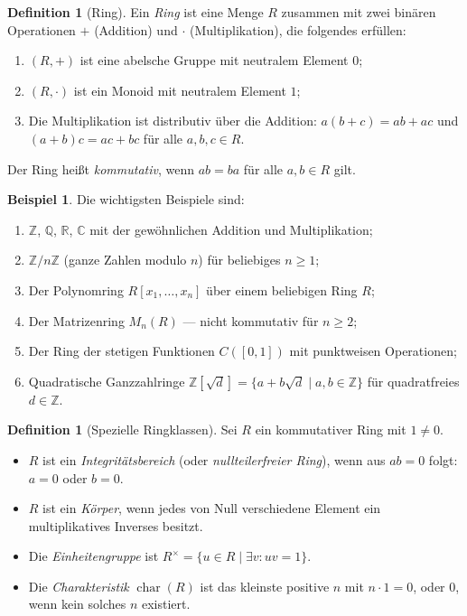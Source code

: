 \documentclass[12pt,a4paper]{amsart}
\theoremstyle{definition}
\newtheorem{definition}[theorem]{Definition}
\newtheorem{example}[theorem]{Beispiel}
\theoremstyle{definition}
\DeclareMathOperator{\chr}{char}
\begin{document}
\begin{definition}[Ring]
Ein \emph{Ring} ist eine Menge $R$ zusammen mit zwei binären Operationen $+$
(Addition) und $\cdot$ (Multiplikation), die folgendes erfüllen:
\begin{enumerate}[label=(\roman*)]
  \item $(R,+)$ ist eine abelsche Gruppe mit neutralem Element $0$;
  \item $(R,\cdot)$ ist ein Monoid mit neutralem Element $1$;
  \item Die Multiplikation ist distributiv über die Addition:
        $a(b+c) = ab + ac$ und $(a+b)c = ac + bc$ für alle $a,b,c \in R$.
\end{enumerate}
Der Ring heißt \emph{kommutativ}, wenn $ab = ba$ für alle $a,b \in R$ gilt.
\end{definition}

\begin{example}\label{bsp:ringe}
Die wichtigsten Beispiele sind:
\begin{enumerate}[label=(\alph*)]
  \item $\mathbb{Z}$, $\mathbb{Q}$, $\mathbb{R}$, $\mathbb{C}$ mit der gewöhnlichen
        Addition und Multiplikation;
  \item $\mathbb{Z}/n\mathbb{Z}$ (ganze Zahlen modulo $n$) für beliebiges $n \geq 1$;
  \item Der Polynomring $R[x_1,\ldots,x_n]$ über einem beliebigen Ring $R$;
  \item Der Matrizenring $M_n(R)$ --- nicht kommutativ für $n \geq 2$;
  \item Der Ring der stetigen Funktionen $C([0,1])$ mit punktweisen Operationen;
  \item Quadratische Ganzzahlringe $\mathbb{Z}[\sqrt{d}] = \{a + b\sqrt{d} \mid a,b \in \mathbb{Z}\}$
        für quadratfreies $d \in \mathbb{Z}$.
\end{enumerate}
\end{example}

\begin{definition}[Spezielle Ringklassen]
Sei $R$ ein kommutativer Ring mit $1 \neq 0$.
\begin{itemize}
  \item $R$ ist ein \emph{Integritätsbereich} (oder \emph{nullteilerfreier Ring}),
        wenn aus $ab = 0$ folgt: $a = 0$ oder $b = 0$.
  \item $R$ ist ein \emph{Körper}, wenn jedes von Null verschiedene Element ein
        multiplikatives Inverses besitzt.
  \item Die \emph{Einheitengruppe} ist $R^\times = \{u \in R \mid \exists v: uv = 1\}$.
  \item Die \emph{Charakteristik} $\chr(R)$ ist das kleinste positive $n$ mit
        $n \cdot 1 = 0$, oder $0$, wenn kein solches $n$ existiert.
\end{itemize}
\end{definition}
\end{document}

